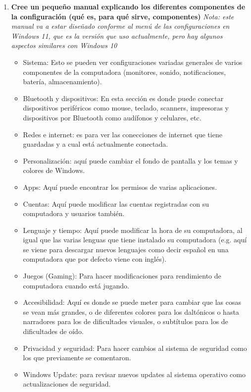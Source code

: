 \documentclass[stu, 12pt, letterpaper, donotrepeattitle, floatsintext, natbib, helv]{apa7}
\begin{document}
\begin{enumerate}
    \item \textbf{Cree un pequeño manual explicando los diferentes componentes de la configuración (qué es, para qué sirve, componentes)}  \textit{Nota: este manual va a estar diseñado conforme al menú de las configuraciones en Windows 11, que es la versión que uso actualmente, pero hay algunos aspectos similares con Windows 10}
    \begin{itemize}
        \item Sistema: Esto se pueden ver configuraciones variadas generales de varios componentes de la computadora (monitores, sonido, notificaciones, batería, almacenamiento).
        \item Bluetooth y dispositivos: En esta sección es donde puede conectar dispositivos periféricos como mouse, teclado, scanners, impresoras y dispositivos por Bluetooth como audífonos y celulares, etc.
        \item Redes e internet: es para ver las conecciones de internet que tiene guardadas y a cual está actualmente conectada.
        \item Personalización: aquí puede cambiar el fondo de pantalla y los temas y colores de Windows.
        \item Apps: Aquí puede encontrar los permisos de varias aplicaciones.
        \item Cuentas: Aquí puede modificar las cuentas registradas con su computadora y usuarios también.
        \item Lenguaje y tiempo: Aquí puede modificar la hora de su computadora, al igual que las varias lenguas que tiene instalado su computadora (e.g. aquí se viene para descargar nuevos lenguajes como decir español en una computadora que por defecto viene con inglés).
        \item Juegos (Gaming): Para hacer modificaciones para rendimiento de computadora cuando está jugando.
        \item Accesibilidad: Aquí es donde se puede meter para cambiar que las cosas se vean más grandes, o de diferentes colores para los daltónicos o hasta narradores para los de dificultades visuales, o subtítulos para los de dificultades de oído.
        \item Privacidad y seguridad: Para hacer cambios al sistema de seguridad como los que previamente se comentaron.
        \item Windows Update: para revisar nuevos updates al sistema operativo como actualizaciones de seguridad.
    \end{itemize}
    

\end{enumerate}
\end{document}
